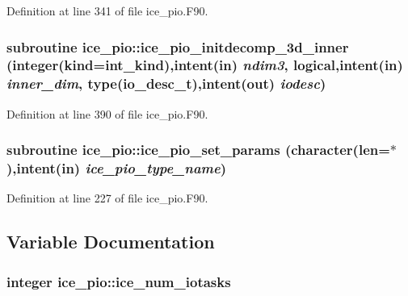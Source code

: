 Definition at line 341 of file ice\_\-pio.F90.\hypertarget{namespaceice__pio_affe281885b53719d3c30c772637990db}{
\subsubsection[{ice\_\-pio\_\-initdecomp\_\-3d\_\-inner}]{\setlength{\rightskip}{0pt plus 5cm}subroutine ice\_\-pio::ice\_\-pio\_\-initdecomp\_\-3d\_\-inner (integer(kind=int\_\-kind),intent(in) {\em ndim3}, \/  logical,intent(in) {\em inner\_\-dim}, \/  type(io\_\-desc\_\-t),intent(out) {\em iodesc})}}
\label{namespaceice__pio_affe281885b53719d3c30c772637990db}


Definition at line 390 of file ice\_\-pio.F90.\hypertarget{namespaceice__pio_a109c38fa2166ac88371fb66b04aa16a5}{
\subsubsection[{ice\_\-pio\_\-set\_\-params}]{\setlength{\rightskip}{0pt plus 5cm}subroutine ice\_\-pio::ice\_\-pio\_\-set\_\-params (character(len=$\ast$),intent(in) {\em ice\_\-pio\_\-type\_\-name})}}
\label{namespaceice__pio_a109c38fa2166ac88371fb66b04aa16a5}


Definition at line 227 of file ice\_\-pio.F90.

\subsection{Variable Documentation}
\hypertarget{namespaceice__pio_a727ea1a597ce3ed71fc1e986d39e263c}{
\subsubsection[{ice\_\-num\_\-iotasks}]{\setlength{\rightskip}{0pt plus 5cm}integer {\bf ice\_\-pio::ice\_\-num\_\-iotasks}}}
\label{namespaceice__pio_a727ea1a597ce3ed71fc1e986d39e263c}


